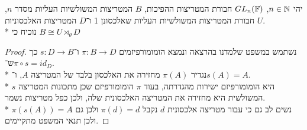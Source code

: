 \Subquestion{}
יהי $n \in \mathbb{N}$, $GL_n(\mathbb{F})$ חבורת המטריצות ההפיכות, $B$ המטריצות המשולשיות העליות מסדר $n$, $U$ חבורת המטריצות המשולשיות העליות שאלכסונן 1 ו־$D$ המטריצות האלכסוניות. \\*
נוכיח כי $B \cong U \rtimes_\theta D$
\begin{proof}
	נשתמש במשפט שלמדנו בהרצאה ונמצא הומומורפיזמים $\pi : B \to D$ ו־$s : D \to B$ כך ש־$\pi \circ s = id_D$. \\*
	נגדיר $\pi(A)$ מחזירה את האלכסון בלבד של המטריצה $A$, ו־$s(A) = A$. \\*
	$s$ היא הומומורפיזם ישירות מהגדרתה, בעוד $\pi$ הומומורפיזם שכן מתכונות המטריצה המשולשית היא מחזירה את המטריצה האלכסונית שלה, ולכן כפל מטריצות נשמר. \\*
	נשים לב גם כי עבור מטריצה אלכסונית $d$ נקבל $\pi(d) = d$ ולכן גם $\pi(s(A)) = A$ ולכן תנאי המשפט מתקיימים.
\end{proof}


